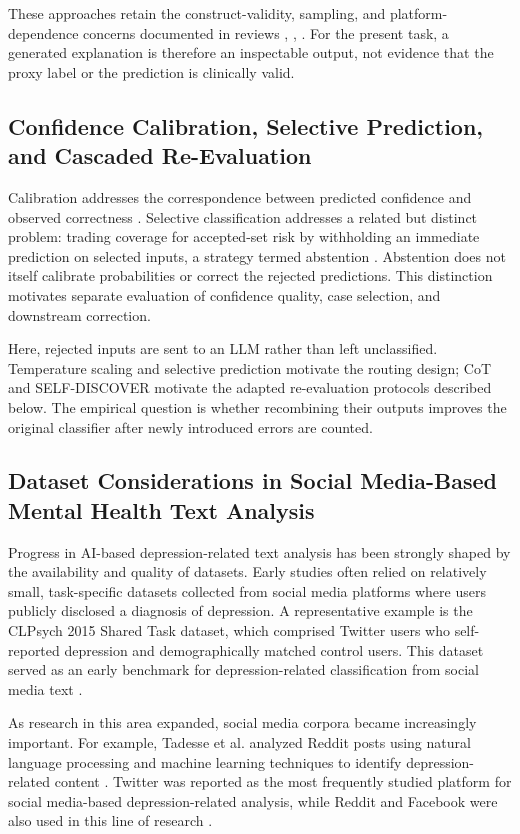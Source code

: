 \documentclass{ieeeaccess}
\begin{document}
These approaches retain the construct-validity, sampling, and platform-dependence concerns documented in reviews \cite{ref36}, \cite{ref37}, \cite{ref46}. For the present task, a generated explanation is therefore an inspectable output, not evidence that the proxy label or the prediction is clinically valid.

\subsection{Confidence Calibration, Selective Prediction, and Cascaded Re-Evaluation}

Calibration addresses the correspondence between predicted confidence and observed correctness \cite{ref15}. Selective classification addresses a related but distinct problem: trading coverage for accepted-set risk by withholding an immediate prediction on selected inputs, a strategy termed abstention \cite{ref16}. Abstention does not itself calibrate probabilities or correct the rejected predictions. This distinction motivates separate evaluation of confidence quality, case selection, and downstream correction.

Here, rejected inputs are sent to an LLM rather than left unclassified. Temperature scaling \cite{ref15} and selective prediction \cite{ref16} motivate the routing design; CoT \cite{ref17} and SELF-DISCOVER \cite{ref18} motivate the adapted re-evaluation protocols described below. The empirical question is whether recombining their outputs improves the original classifier after newly introduced errors are counted.

\subsection{Dataset Considerations in Social Media-Based Mental Health Text Analysis}

Progress in AI-based depression-related text analysis has been strongly shaped by the availability and quality of datasets. Early studies often relied on relatively small, task-specific datasets collected from social media platforms where users publicly disclosed a diagnosis of depression. A representative example is the CLPsych 2015 Shared Task dataset, which comprised Twitter users who self-reported depression and demographically matched control users. This dataset served as an early benchmark for depression-related classification from social media text \cite{ref23}.

As research in this area expanded, social media corpora became increasingly important. For example, Tadesse et al. analyzed Reddit posts using natural language processing and machine learning techniques to identify depression-related content \cite{ref31}. Twitter was reported as the most frequently studied platform for social media-based depression-related analysis, while Reddit and Facebook were also used in this line of research \cite{ref36}.
\end{document}
